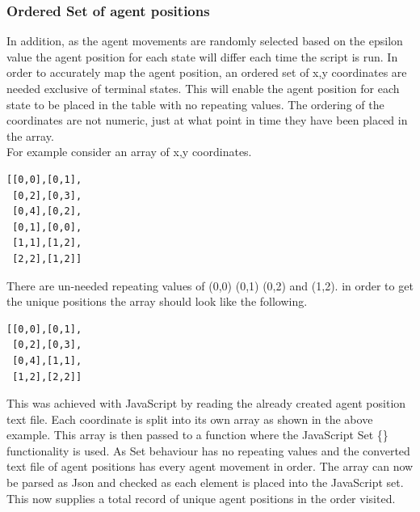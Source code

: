 \subsubsection{Ordered Set of agent positions}
In addition, as the agent movements are randomly selected based on the epsilon value the agent position for each state will differ each time the script is run. In order to accurately map the agent position, an ordered set of x,y coordinates are needed exclusive of terminal states. This will enable the agent position for each state to be placed in the table with no repeating values. The ordering of the coordinates are not numeric, just at what point in time they have been placed in the array.\\
For example consider an array of x,y coordinates.
\begin{verbatim}
[[0,0],[0,1],
 [0,2],[0,3],
 [0,4],[0,2],
 [0,1],[0,0],
 [1,1],[1,2],
 [2,2],[1,2]]
\end{verbatim}
There are un-needed repeating values of (0,0) (0,1) (0,2) and (1,2).
in order to get the unique positions the array should look like the following.\\
\begin{verbatim}
[[0,0],[0,1],
 [0,2],[0,3],
 [0,4],[1,1],
 [1,2],[2,2]]
\end{verbatim}
This was achieved with JavaScript by reading the already created agent position text file. Each coordinate is split into its own array as shown in the above example. This array is then passed to a function where the JavaScript Set \{\} functionality is used. As Set behaviour has no repeating values and the converted text file of agent positions has every agent movement in order. The array can now be parsed as Json and checked as each element is placed into the JavaScript set. This now supplies a total record of unique agent positions in the order visited.
